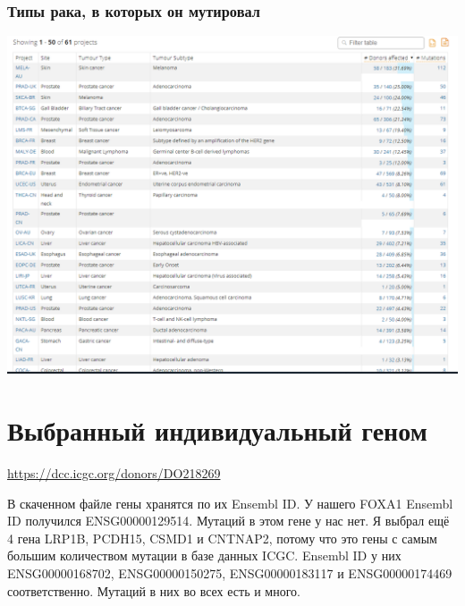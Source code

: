 \documentclass{article}
\begin{document}
  \subsubsection{Типы рака, в которых он мутировал}
  \includegraphics[width=\textwidth]{more cancer types.png}

  \newpage
  \section{Выбранный индивидуальный геном}
  \begin{center}
    \url{https://dcc.icgc.org/donors/DO218269}
  \end{center}

  \noindent
    В скаченном файле гены хранятся по их Ensembl ID.
    У нашего FOXA1 Ensembl ID получился ENSG00000129514.
    Мутаций в этом гене у нас нет.
    Я выбрал ещё 4 гена LRP1B, PCDH15, CSMD1 и CNTNAP2,
    потому что это гены с самым большим количеством мутации в базе данных ICGC.
    Ensembl ID у них ENSG00000168702, ENSG00000150275, ENSG00000183117 и ENSG00000174469 соответственно.
    Мутаций в них во всех есть и много.
\end{document}
